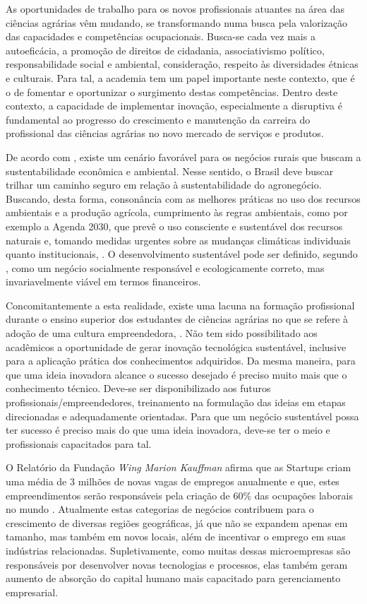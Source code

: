 As oportunidades de trabalho para os novos profissionais atuantes na área das ciências agrárias vêm mudando, se transformando numa busca pela valorização das capacidades e competências ocupacionais. Busca-se cada vez mais a autoeficácia, a promoção de direitos de cidadania, associativismo político, responsabilidade social e ambiental, consideração, respeito às diversidades étnicas e culturais. Para tal, a academia tem um papel importante neste contexto, que é o de fomentar e oportunizar o surgimento destas competências. Dentro deste contexto, a capacidade de implementar inovação, especialmente a disruptiva é fundamental ao progresso do crescimento e manutenção da carreira do profissional das ciências agrárias no novo mercado de serviços e produtos. 


De acordo com , existe um cenário favorável para os negócios rurais que buscam a sustentabilidade econômica e ambiental. Nesse sentido, o Brasil deve buscar trilhar um caminho seguro em relação à sustentabilidade do agronegócio. Buscando, desta forma, consonância com as melhores práticas no uso dos recursos ambientais e a produção agrícola, cumprimento às regras ambientais, como por exemplo a Agenda 2030, que prevê o uso consciente e sustentável dos recursos naturais e, tomando medidas urgentes sobre as mudanças climáticas individuais quanto institucionais, \cite{filho_documentos_2017}. O desenvolvimento sustentável pode ser definido, segundo \cite{lara_ideologia_2017}, como um negócio socialmente responsável e ecologicamente correto, mas invariavelmente viável em termos financeiros.


Concomitantemente a esta realidade, existe uma lacuna na formação profissional durante o ensino superior dos estudantes de ciências agrárias no que se refere à adoção de uma cultura empreendedora, \cite{araujo_educacao_2019}. Não tem sido possibilitado aos acadêmicos a oportunidade de gerar inovação tecnológica sustentável, inclusive para a aplicação prática dos conhecimentos adquiridos. Da mesma maneira, para que uma ideia inovadora alcance o sucesso desejado é preciso muito mais que o conhecimento técnico. Deve-se ser disponibilizado aos futuros profissionais/empreendedores, treinamento na formulação das ideias em etapas direcionadas e adequadamente orientadas. Para que um negócio sustentável possa ter sucesso é preciso mais do que uma ideia inovadora, deve-se ter o meio e profissionais capacitados para tal. 


O Relatório da Fundação \textit{Wing Marion Kauffman} afirma que as Startups criam uma média de 3 milhões de novas vagas de empregos anualmente e que, estes empreendimentos serão responsáveis pela criação de 60\% das ocupações laborais no mundo \cite{brasil_neto_resistencia_2017}. Atualmente estas categorias de negócios contribuem para o crescimento de diversas regiões geográficas, já que não se expandem apenas em tamanho, mas também em novos locais, além de incentivar o emprego em suas indústrias relacionadas. Supletivamente, como muitas dessas microempresas são responsáveis por desenvolver novas tecnologias e processos, elas também geram aumento de absorção do capital humano mais capacitado para gerenciamento empresarial.



